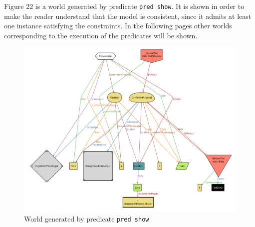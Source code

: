 \clearpage{}

\begin{landscape}

Figure 22 is a world generated by predicate \lstinline!pred show!.
It is shown in order to make the reader understand that the model
is consistent, since it admits at least one instance satisfying the
constraints. In the following pages other worlds corresponding to
the execution of the predicates will be shown.

\begin{figure}[H]
\begin{centering}
\includegraphics[scale=0.5]{alloy/instances/world1}
\par\end{centering}

\protect\caption{World generated by predicate \lstinline!pred show!}


\end{figure}


\end{landscape}

\clearpage{}

